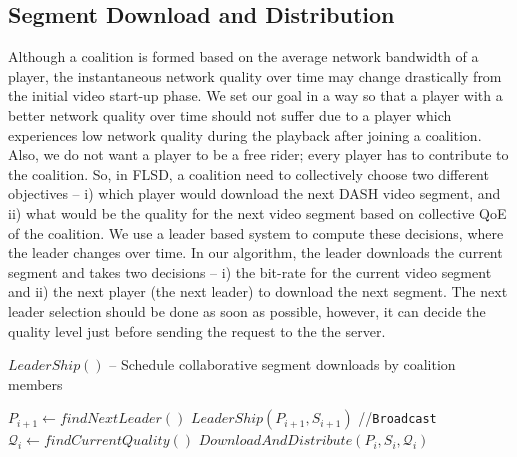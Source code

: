 \subsection{Segment Download and Distribution}
Although a coalition is formed based on the average network bandwidth of a player, the instantaneous network quality over time may change drastically from the initial video start-up phase. We set our goal in a way so that a player with a better network quality over time should not suffer due to a player which experiences low network quality during the playback after joining a coalition. Also, we do not want a player to be a free rider; every player has to contribute to the coalition. 
So, in FLSD, a coalition need to collectively choose two different objectives -- i) which player would download the next DASH video segment, and ii) what would be the quality for the next video segment based on collective QoE of the coalition. We use a leader based system to compute these decisions, where the leader changes over time. In our algorithm, the leader downloads the current segment and takes two decisions -- i) the bit-rate for the current video segment and ii) the next player (the next leader) to download the next segment.
The next leader selection should be done as soon as possible, however, it can decide the quality level just before sending the request to the the server.

\begin{algorithm}[!ht]
    \scriptsize 
	\DontPrintSemicolon
	\caption{\label{algo:leadership}$LeaderShip()$ -- Schedule collaborative segment downloads by coalition members}
	

	
	$P_{i+1} \leftarrow findNextLeader()$\;
	$LeaderShip(P_{i+1}, S_{i+1})$ \hspace{1mm} //\texttt{Broadcast} \;
	$\mathcal{Q}_i \leftarrow findCurrentQuality()$\;
	$DownloadAndDistribute(P_i, S_i, \mathcal{Q}_i)$\;
\end{algorithm}

